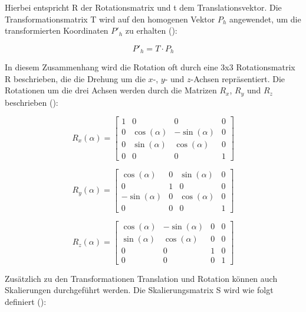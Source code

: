 Hierbei entspricht R der Rotationsmatrix und t dem Translationsvektor. Die Transformationsmatrix T wird auf den homogenen Vektor \(P_h\) angewendet, um die transformierten Koordinaten \(P'_h\) zu erhalten (\cite{doerner2022virtual, gao2021vSLAM, freescale2010math3d}):

\begin{equation} 
    P'_h = T \cdot P_h \label{eq:transformationsmatrix}
\end{equation}

In diesem Zusammenhang wird die Rotation oft durch eine 3x3 Rotationsmatrix R beschrieben, die die Drehung um die \(x\)-, \(y\)- und \(z\)-Achsen repräsentiert. Die Rotationen um die drei Achsen werden durch die Matrizen \(R_x\), \(R_y\) und \(R_z\) beschrieben (\cite{doerner2022virtual, gao2021vSLAM, freescale2010math3d}):


\begin{equation}
    R_x(\alpha) =
    \begin{bmatrix}
        1 & 0 & 0 & 0 \\
        0 & \cos(\alpha) & -\sin(\alpha) & 0 \\
        0 & \sin(\alpha) & \cos(\alpha) & 0 \\
        0 & 0 & 0 & 1
    \end{bmatrix}
\end{equation}

\begin{equation}
    R_y(\alpha) =
    \begin{bmatrix}
        \cos(\alpha) & 0 & \sin(\alpha) & 0 \\
        0 & 1 & 0 & 0 \\
        -\sin(\alpha) & 0 & \cos(\alpha) & 0 \\
        0 & 0 & 0 & 1
    \end{bmatrix}
\end{equation}

\begin{equation}
    R_z(\alpha) =
    \begin{bmatrix}
        \cos(\alpha) & -\sin(\alpha) & 0 & 0 \\
        \sin(\alpha) & \cos(\alpha) & 0 & 0 \\
        0 & 0 & 1 & 0 \\
        0 & 0 & 0 & 1
    \end{bmatrix}
\end{equation}

Zusätzlich zu den Transformationen Translation und Rotation können auch Skalierungen durchgeführt werden. Die Skalierungsmatrix S wird wie folgt definiert (\cite{doerner2022virtual, gao2021vSLAM, freescale2010math3d}):

